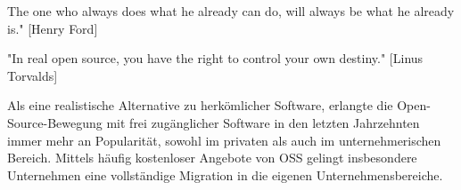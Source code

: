 The one who always does what he already can do, will always be what he already is." [Henry Ford]

"In real open source, you have the right to control your own destiny." [Linus Torvalds]

Als eine realistische Alternative zu herkömlicher Software, erlangte die Open-Source-Bewegung mit frei zugänglicher Software in den letzten Jahrzehnten immer mehr an Popularität, sowohl im privaten als auch im unternehmerischen Bereich. Mittels häufig kostenloser Angebote von OSS gelingt insbesondere Unternehmen eine vollständige Migration in die eigenen Unternehmensbereiche.    


